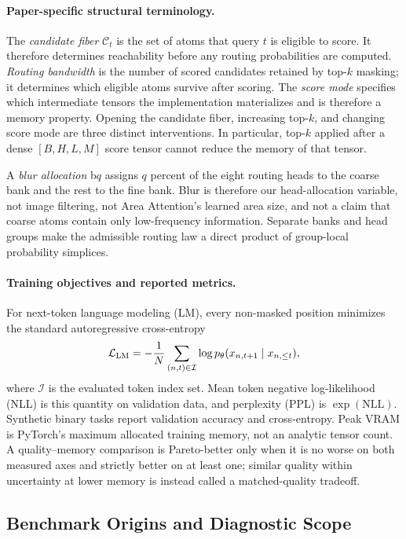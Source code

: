 \documentclass{article}
\theoremstyle{plain}
\theoremstyle{definition}
\theoremstyle{remark}
\begin{document}
\paragraph{Paper-specific structural terminology.}
The \emph{candidate fiber} $\mathcal C_t$ is the set of atoms that query $t$ is
eligible to score.  It therefore determines reachability before any routing
probabilities are computed.  \emph{Routing bandwidth} is the number of scored
candidates retained by top-$k$ masking; it determines which eligible atoms
survive after scoring.  The \emph{score mode} specifies which intermediate
tensors the implementation materializes and is therefore a memory property.
Opening the candidate fiber, increasing top-$k$, and changing score mode are
three distinct interventions.  In particular, top-$k$ applied after a dense
$[B,H,L,M]$ score tensor cannot reduce the memory of that tensor.

A \emph{blur allocation} b$q$ assigns $q$ percent of the eight routing heads
to the coarse bank and the rest to the fine bank.  Blur is therefore our
head-allocation variable, not image filtering, not Area Attention's learned
area size, and not a claim that coarse atoms contain only low-frequency
information.  Separate banks and head groups make the admissible routing law a
direct product of group-local probability simplices.

\paragraph{Training objectives and reported metrics.}
For next-token language modeling (LM), every non-masked position minimizes the
standard autoregressive cross-entropy
\begin{equation}
\label{eq:background-lm-loss}
\mathcal L_{\rm LM}=-\frac{1}{N}\sum_{(n,t)\in\mathcal I}
\log p_\theta(x_{n,t+1}\mid x_{n,\le t}),
\end{equation}
where $\mathcal I$ is the evaluated token index set.  Mean token negative
log-likelihood (NLL) is this quantity on validation data, and perplexity (PPL)
is $\exp(\mathrm{NLL})$.  Synthetic binary tasks report validation accuracy
and cross-entropy.  Peak VRAM is PyTorch's maximum allocated training memory,
not an analytic tensor count.  A quality--memory comparison is Pareto-better
only when it is no worse on both measured axes and strictly better on at least
one; similar quality within uncertainty at lower memory is instead called a
matched-quality tradeoff.

\subsection{Benchmark Origins and Diagnostic Scope}
\label{sec:benchmark-origins}
\end{document}
